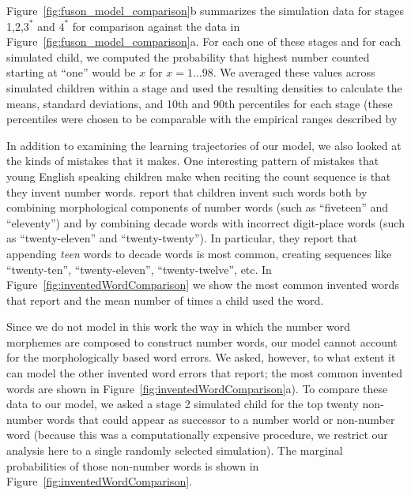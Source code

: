 \documentclass[10pt,letterpaper]{article}
\begin{document}
Figure~\ref{fig:fuson_model_comparison}b summarizes the simulation
data for stages 1,2,$3^*$ and $4^*$ for comparison against the
\citeauthor{FusRicBriar1982} data in
Figure~\ref{fig:fuson_model_comparison}a. For each one of these stages
and for each simulated child, we computed the probability that highest
number counted starting at ``one'' would be $x$ for $x=1 \dots 98$. We
averaged these values across simulated children within a stage and
used the resulting densities to calculate the means, standard
deviations, and 10th and 90th percentiles for each stage (these
percentiles were chosen to be comparable with the empirical ranges described
by \citeauthor{FusRicBriar1982}

In addition to examining the learning trajectories of our model, we
also looked at the kinds of mistakes that it makes. One interesting
pattern of mistakes that young English speaking children make when
reciting the count sequence is that they invent number
words. \citeauthor{FusRicBriar1982} report that children invent such
words both by combining morphological components of number words (such
as ``fiveteen'' and ``eleventy'') and by combining decade words with
incorrect digit-place words (such as ``twenty-eleven'' and
``twenty-twenty''). In particular, they report that appending
\emph{teen} words to decade words is most common, creating sequences
like ``twenty-ten'', ``twenty-eleven'', ``twenty-twelve'', etc.
In Figure~\ref{fig:inventedWordComparison} we show the most common invented
words that \citeauthor{FusRicBriar1982} report and the mean number of
times a child used the word. 

Since we do not model in this work the way in which the number word
morphemes are composed to construct number words, our model cannot
account for the morphologically based word errors. We asked, however,
to what extent it can model the other invented word errors that
\citeauthor{FusRicBriar1982} report; the most common invented words
are shown in Figure~\ref{fig:inventedWordComparison}a). To compare
these data to our model, we asked a stage 2 simulated child for the
top twenty non-number words that could appear as successor to a number
world or non-number word (because this was a computationally expensive
procedure, we restrict our analysis here to a single randomly selected
simulation). The marginal probabilities of those non-number words is
shown in Figure~\ref{fig:inventedWordComparison}.

\end{document}
